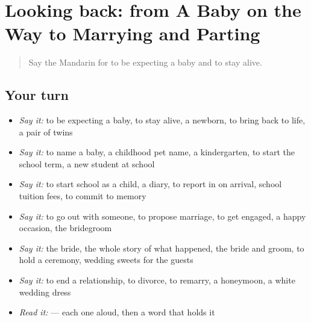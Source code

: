 \section[(dialogue)]{Looking back: from A Baby on the Way to Marrying and Parting}

\label{lesson:ZH-R307-review-302-307}



\begin{quote}
Say the Mandarin for to be expecting a baby and to stay alive.
\end{quote}

\subsection*{Your turn}
\begin{itemize}
\raggedright
  \item \emph{Say it:} to be expecting a baby, to stay alive, a newborn, to bring back to life, a pair of twins
  \item \emph{Say it:} to name a baby, a childhood pet name, a kindergarten, to start the school term, a new student at school
  \item \emph{Say it:} to start school as a child, a diary, to report in on arrival, school tuition fees, to commit to memory
  \item \emph{Say it:} to go out with someone, to propose marriage, to get engaged, a happy occasion, the bridegroom
  \item \emph{Say it:} the bride, the whole story of what happened, the bride and groom, to hold a ceremony, wedding sweets for the guests
  \item \emph{Say it:} to end a relationship, to divorce, to remarry, a honeymoon, a white wedding dress
  \item \emph{Read it:}    — each one aloud, then a word that holds it
\end{itemize}

